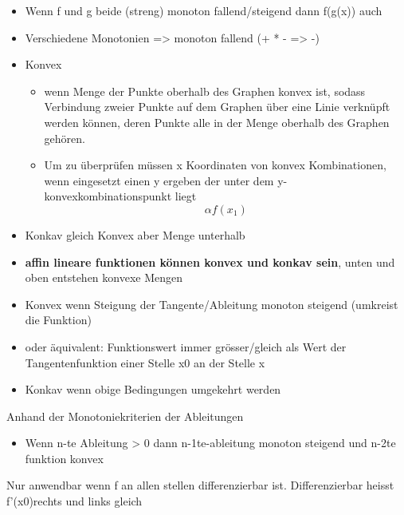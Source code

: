 \begin{theorem}
    \begin{itemize}
        \item Wenn f und g beide (streng) monoton fallend/steigend dann f(g(x)) auch 
        \item Verschiedene Monotonien =>  monoton fallend  (+ * - => -)
    \end{itemize}
\end{theorem}

\begin{definition}
    [Konvexität] 
    \begin{itemize}
        \item Konvex
        \begin{itemize}
            \item wenn Menge der Punkte oberhalb des Graphen konvex ist, sodass Verbindung zweier Punkte auf dem Graphen über eine Linie verknüpft werden können, deren Punkte alle in der Menge oberhalb des Graphen gehören.
            \item Um zu überprüfen müssen x Koordinaten von konvex Kombinationen, wenn eingesetzt einen y ergeben der unter dem y-konvexkombinationspunkt liegt 
            \begin{equation}
                \alpha f(x_1) 
            \end{equation}
        \end{itemize}
        \item Konkav gleich Konvex aber Menge unterhalb
        \item \textbf{affin lineare funktionen können konvex und konkav sein}, unten und oben entstehen konvexe Mengen
    \end{itemize}
\end{definition}

\begin{theorem}
    \begin{itemize}
        \item Konvex wenn Steigung der Tangente/Ableitung monoton steigend (umkreist die Funktion)
        \item oder äquivalent: Funktionswert immer grösser/gleich als Wert der Tangentenfunktion einer Stelle x0 an der Stelle x 
        \item Konkav wenn obige Bedingungen umgekehrt werden 
    \end{itemize}
\end{theorem}

\begin{theorem}
       Anhand der Monotoniekriterien der Ableitungen 
     \begin{itemize}
        \item Wenn n-te Ableitung > 0 dann  n-1te-ableitung monoton steigend und n-2te funktion konvex 
     \end{itemize}
     Nur anwendbar wenn f an allen stellen differenzierbar ist. Differenzierbar heisst f'(x0)rechts und links gleich
\end{theorem}